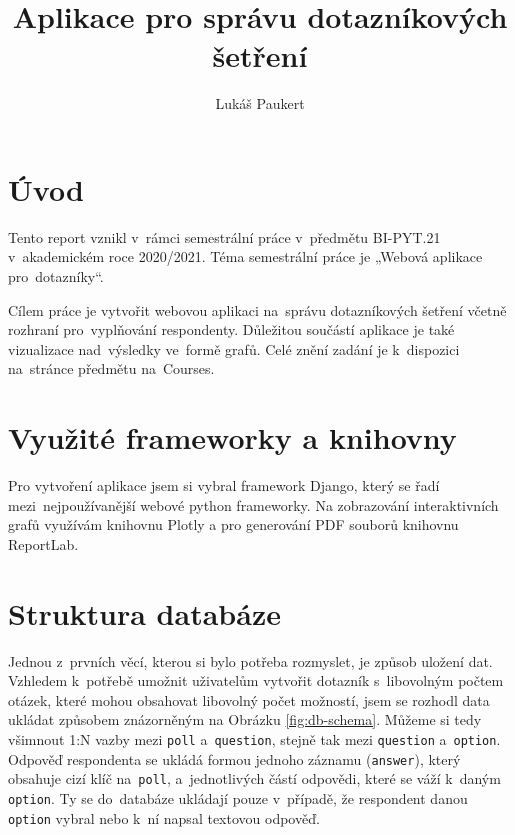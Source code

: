 \documentclass[czech]{pyt-report}
\title{Aplikace pro správu dotazníkových šetření}
\author{Lukáš Paukert}
\affiliation{ČVUT -- FIT}
\begin{document}
\maketitle

\section{Úvod}

Tento report vznikl v~rámci semestrální práce v~předmětu BI-PYT.21 v~akademickém roce 2020/2021. Téma semestrální práce je „Webová aplikace pro~dotazníky“.

Cílem práce je vytvořit webovou aplikaci na~správu dotazníkových šetření včetně rozhraní pro~vyplňování respondenty. Důležitou součástí aplikace je také vizualizace nad~výsledky ve~formě grafů. Celé znění zadání je k~dispozici na~stránce předmětu na~Courses.

\section{Využité frameworky a knihovny}

Pro vytvoření aplikace jsem si vybral framework Django, který se řadí mezi~nejpoužívanější webové python frameworky\cite{jetbrains_survey}. Na zobrazování interaktivních grafů využívám knihovnu Plotly a pro generování PDF souborů knihovnu ReportLab.

\section{Struktura databáze}

Jednou z~prvních věcí, kterou si bylo potřeba rozmyslet, je způsob uložení dat. Vzhledem k~potřebě umožnit uživatelům vytvořit dotazník s~libovolným počtem otázek, které mohou obsahovat libovolný počet možností, jsem se rozhodl data ukládat způsobem znázorněným na Obrázku \ref{fig:db-schema}. Můžeme si tedy všimnout 1:N vazby mezi \texttt{poll} a~\texttt{question}, stejně tak mezi \texttt{question} a~\texttt{option}. Odpověď respondenta se ukládá formou jednoho záznamu (\texttt{answer}), který obsahuje cizí klíč na~\texttt{poll}, a~jednotlivých částí odpovědi, které se váží k~daným \texttt{option}. Ty se do~databáze ukládají pouze v~případě, že respondent danou \texttt{option} vybral nebo k~ní napsal textovou odpověď.
\end{document}
